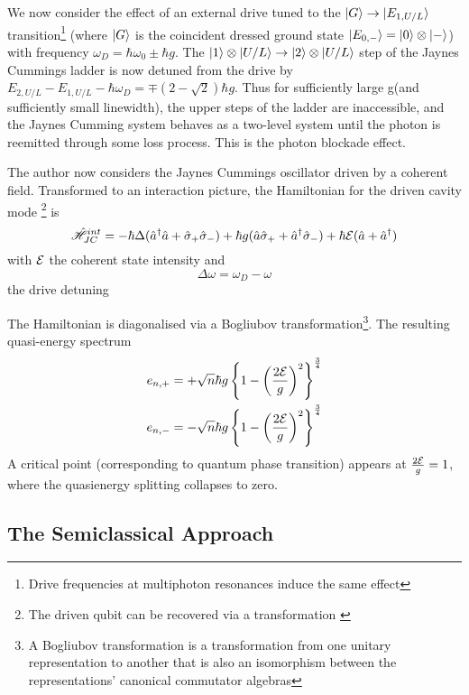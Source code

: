 We now consider the effect of an external drive tuned to the $| G \rangle \rightarrow | E_{1, U/L} \rangle$ transition\footnote{Drive frequencies at multiphoton resonances induce the same effect} (where $| G \rangle$ is the coincident dressed ground state $| E_{0, -} \rangle = | 0 \rangle \otimes | - \rangle$) with frequency $\omega_D = \hbar \omega_0 \pm \hbar g$.
The $| 1 \rangle \otimes | U/L \rangle \rightarrow | 2 \rangle \otimes | U/L \rangle$ step of the Jaynes Cummings ladder is now detuned from the drive by $E_{2, U/L} - E_{1, U/L} - \hbar \omega_D =  \mp(2-\sqrt{2}) \hbar g$. Thus for sufficiently large g(and sufficiently small linewidth), the upper steps of the ladder are inaccessible, and the Jaynes Cumming system behaves as a two-level system until the photon is reemitted through some loss process. This is the photon blockade effect.

The author now considers the Jaynes Cummings oscillator driven by a coherent field. Transformed to an interaction picture, the Hamiltonian for the driven cavity mode \footnote{The driven qubit can be recovered via a transformation \autocite{Alsing1999}} is 
\begin{equation}
	\hat{\mathscr{H}}_{JC}^{int} = -\hbar \Delta (\hat{a}^\dagger \hat{a} + \hat{\sigma}_+ \hat{\sigma}_-) + \hbar g(\hat{a} \hat{\sigma}_+ + \hat{a}^\dagger \hat{\sigma}_-) + \hbar \mathcal{E}(\hat{a} + \hat{a}^\dagger)
\end{equation}
with $\mathcal{E}$ the coherent state intensity and
\begin{equation}
	\Delta \omega = \omega_D - \omega
\end{equation}
the drive detuning

The Hamiltonian is diagonalised via a Bogliubov transformation\footnote{A Bogliubov transformation is a transformation from one unitary representation to another that is also an isomorphism between the representations' canonical commutator algebras}. The resulting quasi-energy spectrum
\begin{align}
	e_{n, +} &= + \sqrt{n} \hbar g \left \{1 - \left ({\frac{2\mathcal{E}}{g}} \right )^2 \right \}^{\frac{3}{4}} \\
	e_{n, -} &= - \sqrt{n} \hbar g \left \{1 - \left ({\frac{2\mathcal{E}}{g}} \right )^2 \right \}^{\frac{3}{4}}
\end{align}
A critical point (corresponding to quantum phase transition) appears at $\frac{2\mathcal{E}}{g} = 1$, where the quasienergy splitting collapses to zero.

\subsection{The Semiclassical Approach}

